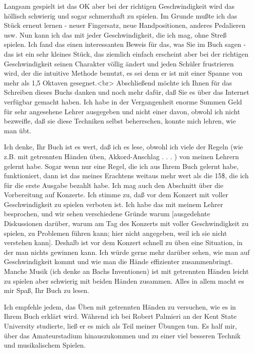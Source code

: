 Langsam gespielt ist das OK aber bei der richtigen Geschwindigkeit wird das höllisch schwierig und sogar schmerzhaft zu spielen.
Im Grunde mußte ich das Stück erneut lernen - neuer Fingersatz, neue Handpositionen, anderes Pedalieren usw.
Nun kann ich das mit jeder Geschwindigkeit, die ich mag, ohne Streß spielen.
Ich fand das einen interessanten Beweis für das, was Sie im Buch sagen - das ist ein sehr kleines Stück, das ziemlich einfach erscheint aber bei der richtigen Geschwindigkeit seinen Charakter völlig ändert und jeden Schüler frustrieren wird, der die intuitive Methode benutzt, es sei denn er ist mit einer Spanne von mehr als 1,5 Oktaven gesegnet.<br>
Abschließend möchte ich Ihnen für das Schreiben dieses Buchs danken und noch mehr dafür, daß Sie es über das Internet verfügbar gemacht haben.
Ich habe in der Vergangenheit enorme Summen Geld für sehr angesehene Lehrer ausgegeben und nicht einer davon, obwohl ich nicht bezweifle, daß sie diese Techniken selbst beherrschen, konnte mich lehren, wie man übt.


\item \label{testimonials10}
Ich denke, Ihr Buch ist es wert, daß ich es lese, obwohl ich viele der Regeln (wie z.B. mit getrennten Händen üben, Akkord-Anschlag . . . ) von meinen Lehrern gelernt habe.
Sogar wenn nur eine Regel, die ich aus Ihrem Buch gelernt habe, funktioniert, dann ist das meines Erachtens weitaus mehr wert als die 15\$, die ich für die erste Ausgabe bezahlt habe.
Ich mag auch den Abschnitt über die Vorbereitung auf Konzerte.
Ich stimme zu, daß vor dem Konzert mit voller Geschwindigkeit zu spielen verboten ist.
Ich habe das mit meinem Lehrer besprochen, und wir sehen verschiedene Gründe warum [ausgedehnte Diskussionen darüber, warum am Tag des Konzerts mit voller Geschwindigkeit zu spielen, zu Problemen führen kann; hier nicht angegeben, weil ich sie nicht verstehen kann].
Deshalb ist vor dem Konzert schnell zu üben eine Situation, in der man nichts gewinnen kann.
Ich würde gerne mehr darüber sehen, wie man auf Geschwindigkeit kommt und wie man die Hände effizienter zusammenbringt.
Manche Musik (ich denke an Bachs Inventionen) ist mit getrennten Händen leicht zu spielen aber schwierig mit beiden Händen zusammen.
Alles in allem macht es mir Spaß, Ihr Buch zu lesen.


\item \label{testimonials11}
Ich empfehle jedem, das Üben mit getrennten Händen zu versuchen, wie es in Ihrem Buch erklärt wird.
Während ich bei Robert Palmieri an der Kent State University studierte, ließ er es mich als Teil meiner Übungen tun.
Es half mir, über das Amateurstadium hinauszukommen und zu einer viel besseren Technik und musikalischem Spielen.


